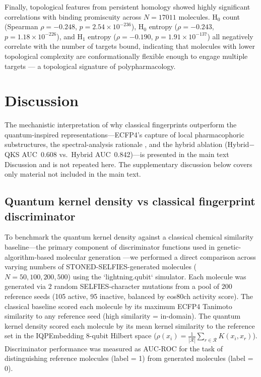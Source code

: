 \documentclass[11pt,a4paper]{article}
\begin{document}
Finally, topological features from persistent homology showed highly significant correlations with binding promiscuity across $N = \num{17011}$ molecules. H$_0$ count (Spearman $\rho = -\num{0.248}$, $p = 2.54 \times 10^{-236}$), H$_0$ entropy ($\rho = -\num{0.243}$, $p = 1.18 \times 10^{-226}$), and H$_1$ entropy ($\rho = -\num{0.190}$, $p = 1.91 \times 10^{-137}$) all negatively correlate with the number of targets bound, indicating that molecules with lower topological complexity are conformationally flexible enough to engage multiple targets --- a topological signature of polypharmacology.


\section{Discussion}



The mechanistic interpretation of why classical fingerprints outperform the quantum-inspired representations---ECFP4's capture of local pharmacophoric substructures, the spectral-analysis rationale \citep{jamali2026spectralanalysismolecularfeatures}, and the hybrid ablation (Hybrid$-$QKS AUC~0.608 vs.\ Hybrid AUC~0.842)---is presented in the main text Discussion and is not repeated here. The supplementary discussion below covers only material not included in the main text.



\subsection{Quantum kernel density vs classical fingerprint discriminator}


To benchmark the quantum kernel density against a classical chemical similarity baseline---the primary component of discriminator functions used in genetic-algorithm-based molecular generation \citep{jensen2019augmenting}---we performed a direct comparison across varying numbers of STONED-SELFIES-generated molecules ($N = 50, 100, 200, 500$) using the `lightning.qubit` simulator. Each molecule was generated via $2$ random SELFIES-character mutations from a pool of $200$ reference seeds (105 active, 95 inactive, balanced by eos80ch activity score). The classical baseline scored each molecule by its maximum ECFP4 Tanimoto similarity to any reference seed (high similarity = in-domain). The quantum kernel density scored each molecule by its mean kernel similarity to the reference set in the IQPEmbedding 8-qubit Hilbert space ($\rho(x_i) = \frac{1}{|\mathcal{R}|}\sum_{r \in \mathcal{R}} K(x_i, x_r)$). Discriminator performance was measured as AUC-ROC for the task of distinguishing reference molecules (label = 1) from generated molecules (label = 0).
\end{document}
